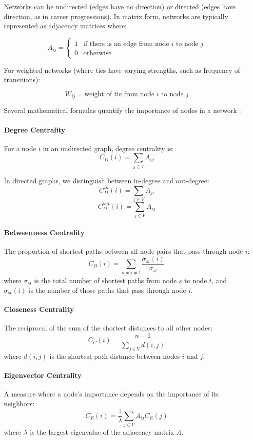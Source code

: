 \documentclass[../main.tex]{subfiles}
\begin{document}
Networks can be undirected (edges have no direction) or directed (edges have direction, as in career progressions). In matrix form, networks are typically represented as adjacency matrices where:

\[ A_{ij} = \begin{cases} 
1 & \text{if there is an edge from node } i \text{ to node } j \\
0 & \text{otherwise}
\end{cases} \]

For weighted networks (where ties have varying strengths, such as frequency of transitions):

\[ W_{ij} = \text{weight of tie from node } i \text{ to node } j \]


Several mathematical formulas quantify the importance of nodes in a network \citep{cambridge_intelligence_centrality}:

\paragraph{Degree Centrality} For a node \(i\) in an undirected graph, degree centrality is:
\[ C_D(i) = \sum_{j \in V} A_{ij} \]

In directed graphs, we distinguish between in-degree and out-degree:
\[ C_{D}^{in}(i) = \sum_{j \in V} A_{ji} \]
\[ C_{D}^{out}(i) = \sum_{j \in V} A_{ij} \]

\paragraph{Betweenness Centrality} The proportion of shortest paths between all node pairs that pass through node \(i\):
\[ C_B(i) = \sum_{s \neq i \neq t} \frac{\sigma_{st}(i)}{\sigma_{st}} \]
where \(\sigma_{st}\) is the total number of shortest paths from node \(s\) to node \(t\), and \(\sigma_{st}(i)\) is the number of those paths that pass through node \(i\).

\paragraph{Closeness Centrality} The reciprocal of the sum of the shortest distances to all other nodes:
\[ C_C(i) = \frac{n-1}{\sum_{j \in V} d(i,j)} \]
where \(d(i,j)\) is the shortest path distance between nodes \(i\) and \(j\).

\paragraph{Eigenvector Centrality} A measure where a node's importance depends on the importance of its neighbors:
\[ C_E(i) = \frac{1}{\lambda} \sum_{j \in V} A_{ij} C_E(j) \]
where \(\lambda\) is the largest eigenvalue of the adjacency matrix \(A\).
\end{document}
